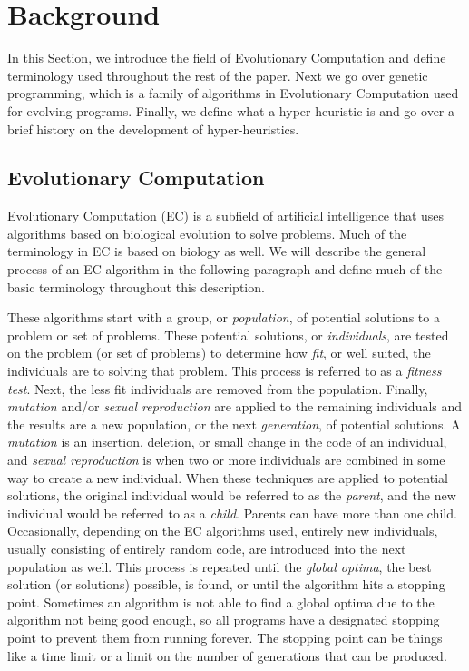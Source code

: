 \documentclass{sig-alternate}
\begin{document}
\section{Background}
\label{sec:background}
In this Section, we introduce the field of Evolutionary Computation and define terminology used throughout the rest of the paper. Next we go over genetic programming, which is a family of algorithms in Evolutionary Computation used for evolving programs. Finally, we define what a hyper-heuristic is and go over a brief history on the development of hyper-heuristics. 
\subsection{Evolutionary Computation}
\label{sec:evocomp}
Evolutionary Computation (EC) is a subfield of artificial intelligence that uses algorithms based on biological evolution to solve problems. Much of the terminology in EC is based on biology as well. We will describe the general process of an EC algorithm in the following paragraph and define much of the basic terminology throughout this description.

These algorithms start with a group, or \textit{population}, of potential solutions to a problem or set of problems. These potential solutions, or \textit{individuals}, are tested on the problem (or set of problems) to determine how \textit{fit}, or well suited, the individuals are to solving that problem. This process is referred to as a \textit{fitness test}. Next, the less fit individuals are removed from the population. Finally, \textit{mutation} and/or \textit{sexual reproduction} are applied to the remaining individuals and the results are a new population, or the next \textit{generation}, of potential solutions. A \textit{mutation} is an insertion, deletion, or small change in the code of an individual, and \textit{sexual reproduction} is when two or more individuals are combined in some way to create a new individual. When these techniques are applied to potential solutions, the original individual would be referred to as the \textit{parent}, and the new individual would be referred to as a \textit{child}. Parents can have more than one child. Occasionally, depending on the EC algorithms used, entirely new individuals, usually consisting of entirely random code, are introduced into the next population as well. This process is repeated until the \textit{global optima}, the best solution (or solutions) possible, is found, or until the algorithm hits a stopping point. Sometimes an algorithm is not able to find a global optima due to the algorithm not being good enough, so all programs have a designated stopping point to prevent them from running forever. The stopping point can be things like a time limit or a limit on the number of generations that can be produced.
\end{document}
